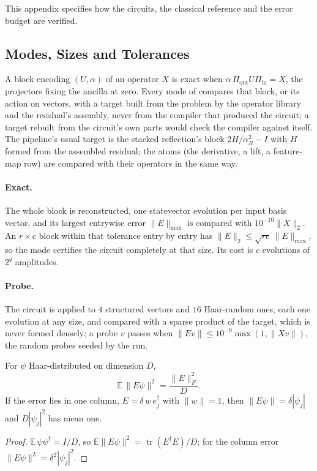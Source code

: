This appendix specifies how the circuits, the classical reference and the error budget are verified.

\subsection{Modes, Sizes and Tolerances}
\label{app:verification-modes}

A block encoding $(U,\alpha)$ of an operator $X$ is exact when $\alpha\,\Pi_{\mathrm{out}}U\Pi_{\mathrm{in}}=X$, the projectors fixing the ancilla at zero. Every mode of  compares that block, or its action on vectors, with a target built from the problem by the operator library and the residual's assembly, never from the compiler that produced the circuit; a target rebuilt from the circuit's own parts would check the compiler against itself. The pipeline's usual target is the stacked reflection's block $2H/\alpha_R^2-I$ with $H$ formed from the assembled residual; the atoms (the derivative, a lift, a feature-map row) are compared with their operators in the same way.

\paragraph{Exact.} The whole block is reconstructed, one statevector evolution per input basis vector, and its largest entrywise error $\|E\|_{\max}$ is compared with $10^{-10}\|X\|_2$. An $r\times c$ block within that tolerance entry by entry has $\|E\|_2\le\sqrt{rc}\,\|E\|_{\max}$, so the mode certifies the circuit completely at that size. Its cost is $c$ evolutions of $2^q$ amplitudes.

\paragraph{Probe.} The circuit is applied to $4$ structured vectors and $16$ Haar-random ones, each one evolution at any size, and compared with a sparse product of the target, which is never formed densely; a probe $v$ passes when $\|Ev\|\le10^{-9}\max(1,\|Xv\|)$, the random probes seeded by the run.

\begin{proposition}
\label{prop:haar-probes}
For $\psi$ Haar-distributed on dimension $D$,
\begin{equation*}
    \mathbb{E}\,\|E\psi\|^2=\frac{\|E\|_F^2}{D}.
\end{equation*}
If the error lies in one column, $E=\delta\,w\,e_j^\dagger$ with $\|w\|=1$, then $\|E\psi\|=\delta|\psi_j|$ and $D|\psi_j|^2$ has mean one.
\end{proposition}
\begin{proof}
$\mathbb{E}\,\psi\psi^\dagger=I/D$, so $\mathbb{E}\|E\psi\|^2=\operatorname{tr}(E^\dagger E)/D$; for the column error $\|E\psi\|^2=\delta^2|\psi_j|^2$.
\end{proof}

